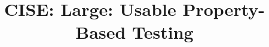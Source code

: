 \documentclass{NSF}
\newcommand{\todo}[1]{\ifdraft {\color{nord-red} TODO: #1} \fi}
\begin{document}
\title{CISE: Large: Usable Property-Based Testing}


\newpage





\newpage{}


\newpage{}
\renewcommand\refname{References Cited}

% 


\newpage{}


% 

% 

\newpage{}


\newpage{}

\newpage

\newpage

\newpage{}

\end{document}
